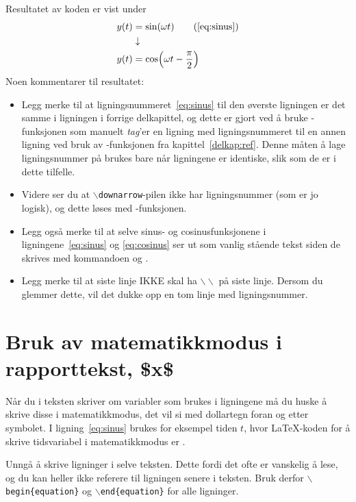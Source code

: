 Resultatet av koden er vist under
\begin{align}
  y(t) & = \sin(\omega t) \tag{\ref{eq:sinus}}\\
        & \downarrow \notag\\
  y(t) & = \cos \Bigl(\omega t - \frac{\pi}{2}\Bigr) \label{eq:cosinus}
\end{align}
Noen kommentarer til resultatet:
\begin{itemize}
\item Legg merke til at ligningsnummeret~\eqref{eq:sinus} til den øverste ligningen er det
  samme i ligningen i forrige delkapittel, og dette er gjort
  ved å bruke -funksjonen som manuelt {\em
    tag}'er en ligning med ligningsnummeret til en annen ligning ved
  bruk av -funksjonen fra
  kapittel~\ref{delkap:ref}. Denne måten å lage ligningsnummer på
  brukes bare når ligningene er identiske, slik som de er i dette
  tilfelle. 

\item Videre ser du at {\tt $\backslash$downarrow}-pilen 
  ikke har ligningsnummer (som er jo logisk), og
  dette løses med -funksjonen.

\item Legg også merke til at selve sinus- og cosinusfunksjonene i ligningene~\eqref{eq:sinus} 
  og \eqref{eq:cosinus} 
  ser ut som vanlig stående tekst siden de skrives med kommandoen 
   og .

\item Legg merke til at siste linje IKKE skal ha
  $\backslash\backslash$ på siste linje. Dersom du glemmer dette, vil det dukke opp
  en tom linje med ligningsnummer.
\end{itemize}



\section{Bruk av matematikkmodus i rapporttekst, \$x\$}
Når du i teksten skriver om variabler som brukes i ligningene må du
huske å skrive disse i matematikkmodus, det vil si med dollartegn
foran og etter symbolet. I ligning~\eqref{eq:sinus} brukes for eksempel tiden
$t$, hvor {\LaTeX}-koden for å skrive tidsvariabel i matematikkmodus er .

Unngå å skrive ligninger i selve teksten. Dette fordi det ofte er
vanskelig å lese, og du kan heller ikke referere til ligningen senere
i teksten. Bruk derfor {\tt $\backslash$begin\{equation\}} og 
  {\tt $\backslash$end\{equation\}} for alle ligninger.


